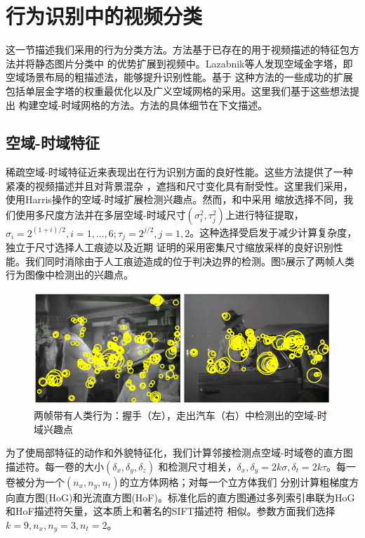 \documentclass[10pt,twocolumn,letterpaper]{article}
\begin{document}
\section{行为识别中的视频分类}
这一节描述我们采用的行为分类方法。方法基于已存在的用于视频描述的特征包方法\cite{3,13,15}并将静态图片分类中
的优势扩展到视频中\cite{2,9,12}。Lazabnik等人\cite{9}发现空域金字塔，即空域场景布局的粗描述法，能够提升识别性能。基于
这种方法的一些成功的扩展包括单层金字塔的权重最优化\cite{2}以及广义空域网格\cite{12}的采用。这里我们基于这些想法提出
构建空域-时域网格的方法。方法的具体细节在下文描述。
\subsection{空域-时域特征}
稀疏空域-时域特征近来表现出在行为识别方面的良好性能\cite{3,6,13,15}。这些方法提供了一种紧凑的视频描述并且对背景混杂
，遮挡和尺寸变化具有耐受性。这里我们采用\cite{7}，使用Harris操作的空域-时域扩展检测兴趣点。然而，和\cite{7}中采用
缩放选择不同，我们使用多尺度方法并在多层空域-时域尺寸$(\sigma^2_i,\tau^2_j)$上进行特征提取，
$\sigma_i=2^{(1+i)/2},i=1,...,6;\tau_j=2^{j/2},j=1,2$。这种选择受启发于减少计算复杂度，独立于尺寸选择人工痕迹以及近期
证明的采用密集尺寸缩放采样的良好识别性能。我们同时消除由于人工痕迹造成的位于判决边界的检测\cite{11}。图5展示了两帧人类
行为图像中检测出的兴趣点。
\begin{figure}[h]
\begin{center}
   \includegraphics[width=1.0\linewidth]{fig5.png}
\end{center}
   \caption{
		   两帧带有人类行为：握手（左），走出汽车（右）中检测出的空域-时域兴趣点
   }
\end{figure}

为了使局部特征的动作和外貌特征化，我们计算邻接检测点空域-时域卷的直方图描述符。每一卷的大小$(\delta_x,\delta_y,\delta_z)$
和检测尺寸相关，$\delta_x,\delta_y=2k\sigma,\delta_t=2k\tau$。每一卷被分为一个$(n_x,n_y,n_t)$的立方体网格；对每一个立方体我们
分别计算粗梯度方向直方图(HoG)和光流直方图(HoF)。标准化后的直方图通过多列索引串联为HoG和HoF描述符矢量，这本质上和著名的SIFT描述符
相似。参数方面我们选择$k=9,n_x,n_y=3,n_t=2$。
\end{document}
